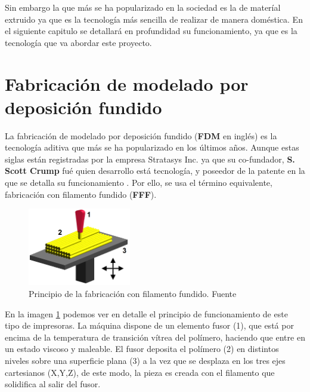 Sin embargo la que más se ha popularizado en la sociedad es la de materíal extruido ya que es la tecnología más sencilla de realizar de manera doméstica. En el siguiente capitulo se detallará en profundidad su funcionamiento, ya que es la tecnología que va abordar este proyecto.

\section{Fabricación de modelado por deposición fundido}
La fabricación de modelado por deposición fundido (\textbf{FDM\textregistered} en inglés) es la tecnología aditiva que más se ha popularizado en los últimos años. Aunque estas siglas están registradas por la empresa Stratasys Inc. ya que su co-fundador,  \textbf{S. Scott Crump} fué quien desarrollo está tecnología, y poseedor de la patente en la que se detalla su funcionamiento \cite{crump1992apparatus}. Por ello, se usa el término equivalente, fabricación con filamento fundido (\textbf{FFF}).\\  
    
    \begin{figure}[H]
            \centering
            \includegraphics[width=0.4\textwidth]{images/FDM_by_Zureks.png}
            \caption{Principio de la fabricación con filamento fundido. Fuente \cite{fundamentoFDM}}
            \label{fig:impr_fdm}
    \end{figure}

En la imagen \ref{fig:impr_fdm} podemos ver en detalle el principio de funcionamiento de este tipo de impresoras. La máquina dispone de un elemento fusor (1), que está por encima de la temperatura de transición vítrea del polímero, haciendo que entre en un estado viscoso y maleable. El fusor deposita el polímero (2) en distintos niveles sobre una superficie plana (3) a la vez que se desplaza en los tres ejes cartesianos (X,Y,Z), de este modo, la pieza es creada con el filamento que solidifica al salir del fusor.\\

